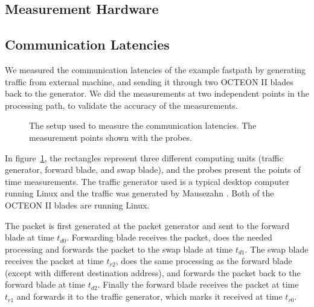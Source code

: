 \subsection{Measurement Hardware}

\subsection{Communication Latencies}

We measured the communication latencies of the example fastpath by generating traffic from external machine, and sending it through two OCTEON II blades back to the generator. We did the measurements at two independent points in the processing path, to validate the accuracy of the measurements.

\begin{figure}[ht]
  \begin{center}
    
    \caption{The setup used to measure the communication latencies. The measurement points shown with the probes. }
    \label{fig:comm-setup}
  \end{center}
\end{figure}

In figure~\ref{fig:comm-setup}, the rectangles represent three different computing units (traffic generator, forward blade, and swap blade), and the probes present the points of time measurements. The traffic generator used is a typical desktop computer running Linux and the traffic was generated by Mausezahn . Both of the OCTEON II blades are running Linux.

The packet is first generated at the packet generator and sent to the forward blade at time $t_{d0}$. Forwarding blade receives the packet, does the needed processing and forwards the packet to the swap blade at time $t_{d1}$. The swap blade receives the packet at time $t_{r2}$, does the same processing as the forward blade (except with different destination address), and forwards the packet back to the forward blade at time $t_{d2}$. Finally the forward blade receives the packet at time $t_{r1}$ and forwards it to the traffic generator, which marks it received at time $t_{r0}$.

